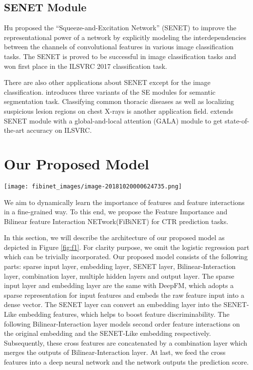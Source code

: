 \documentclass[sigconf]{acmart}
\begin{document}
\subsection{SENET Module}
Hu \cite{hu2017squeeze} proposed the ``Squeeze-and-Excitation Network'' (SENET) to improve the representational power of a network by explicitly modeling
the interdependencies between the channels of convolutional features in
various image classification tasks. The SENET is proved to be successful
in image classification tasks and won first place in the ILSVRC 2017
classification task.

There are also other applications about SENET except for the image
classification\cite{yan2018weakly,kitada2018skin,roy2018recalibrating}. \cite{roy2018recalibrating} introduces three variants of the SE modules for semantic segmentation task. Classifying common thoracic diseases as
well as localizing suspicious lesion regions on chest X-rays\cite{yan2018weakly} is another application field. \cite{linsley2018global}
extends SENET module with a global-and-local attention (GALA) module
to get state-of-the-art accuracy on ILSVRC.

\section{Our Proposed Model}
\label{sec:s3}
\begin{figure*}
\centering
\texttt{[image: fibinet\_images/image-20181020000624735.png]}


\caption{The architecture of our proposed FiBiNET}
\label{fig:f1}
\end{figure*}
We aim to dynamically learn the importance of features and feature interactions in a
fine-grained way. To this end, we propose the Feature Importance and
Bilinear feature Interaction NETwork(FiBiNET) for CTR prediction tasks.

In this section, we will describe the architecture of our proposed model as depicted in Figure \ref{fig:f1}. For clarity purpose, we omit the logistic regression part which
can be trivially incorporated. Our proposed
model consists of the following parts: sparse input layer, embedding
layer, SENET layer, Bilinear-Interaction layer, combination layer,
multiple hidden layers and output layer. The sparse input layer and
embedding layer are the same with DeepFM\cite{guo2017deepfm}, which adopts a sparse
representation for input features and embeds the raw feature input into
a dense vector. The SENET layer can convert an embedding layer into the
SENET-Like embedding features, which helps to boost feature
discriminability. The following Bilinear-Interaction
layer models second order feature interactions on the original embedding and
the SENET-Like embedding respectively. Subsequently, these cross features are concatenated by a combination layer which merges the
outputs of Bilinear-Interaction layer. At last, we feed the cross features into a deep neural network and the network outputs the
prediction score.
\end{document}
